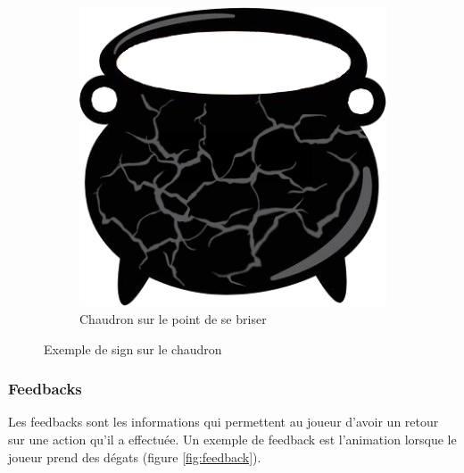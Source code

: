 \begin{figure}[!ht]
\begin{subfigure}[t]{0.45\textwidth}
            \includegraphics[width=\textwidth]{image/chaudron/chaudron3.png}
            \caption{Chaudron sur le point de se briser}
        \end{subfigure}
        \caption{Exemple de sign sur le chaudron}
        \label{fig:sign}
    \end{figure}


\subsubsection{Feedbacks}
    Les feedbacks sont les informations qui permettent au joueur d'avoir un retour sur une action qu'il a effectuée. Un exemple de feedback est l'animation lorsque le joueur prend des dégats (figure \ref{fig:feedback}). 
    
